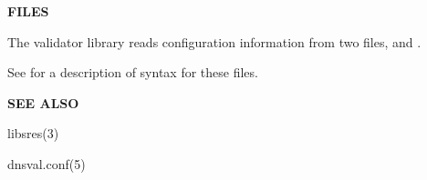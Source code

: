 {\bf FILES}

The validator library reads configuration information from two files,
 and .

See  for a description of syntax for these files.

{\bf SEE ALSO}

libsres(3)

dnsval.conf(5)

